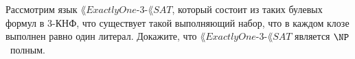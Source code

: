 Рассмотрим язык $\lang{ExactlyOne}\text{-}3\text{-}\lang{SAT}$, который состоит из таких булевых формул в $3$-КНФ, что
существует такой выполняющий набор, что в каждом клозе выполнен равно один литерал. Докажите, что
$\lang{ExactlyOne}\text{-}3\text{-}\lang{SAT}$ является $\NP$~полным. 